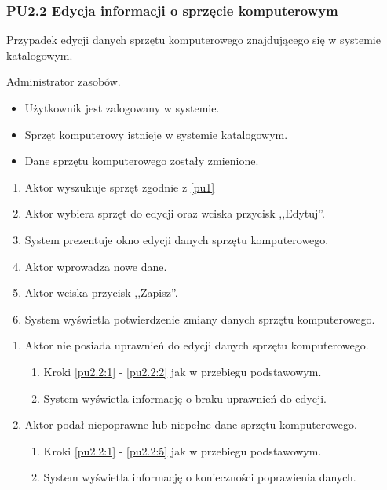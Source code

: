 \subsubsection{PU2.2 Edycja informacji o sprzęcie komputerowym}

Przypadek edycji danych sprzętu komputerowego znajdującego się w systemie katalogowym.

Administrator zasobów.

\begin{itemize}
\item Użytkownik jest zalogowany w systemie.
\item Sprzęt komputerowy istnieje w systemie katalogowym.
\end{itemize}

\begin{itemize}
\item Dane sprzętu komputerowego zostały zmienione.
\end{itemize}

\begin{enumerate}
\item \label{pu2.2:1} Aktor wyszukuje sprzęt zgodnie z \ref{pu1}
\item \label{pu2.2:2} Aktor wybiera sprzęt do edycji oraz wciska przycisk ,,Edytuj''.
\item System prezentuje okno edycji danych sprzętu komputerowego.
\item Aktor wprowadza nowe dane.
\item \label{pu2.2:5} Aktor wciska przycisk ,,Zapisz''.
\item System wyświetla potwierdzenie zmiany danych sprzętu komputerowego.
\end{enumerate}

\begin{enumerate}
\item Aktor nie posiada uprawnień do edycji danych sprzętu komputerowego.
	\begin{enumerate}[label*=\arabic*.]
		\item Kroki \ref{pu2.2:1} - \ref{pu2.2:2} jak w przebiegu podstawowym.
		\item System wyświetla informację o braku uprawnień do edycji.
	\end{enumerate}
\item Aktor podał niepoprawne lub niepełne dane sprzętu komputerowego.
	\begin{enumerate}[label*=\arabic*.]
		\item Kroki \ref{pu2.2:1} - \ref{pu2.2:5} jak w przebiegu podstawowym.
		\item System wyświetla informację o konieczności poprawienia danych.
	\end{enumerate}
\end{enumerate}

